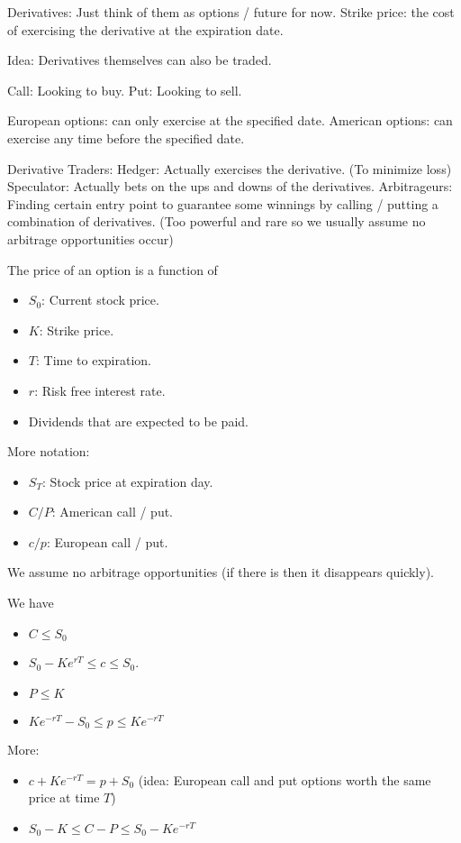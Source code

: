 \documentclass[a4paper]{article}
\begin{document}
Derivatives: Just think of them as options / future for now. 
Strike price: the cost of exercising the derivative at the expiration date. 

Idea: Derivatives themselves can also be traded. 

Call: Looking to buy. 
Put: Looking to sell. 

European options: can only exercise at the specified date. 
American options: can exercise any time before the specified date. 

Derivative Traders: 
Hedger: Actually exercises the derivative. (To minimize loss)
Speculator: Actually bets on the ups and downs of the derivatives. 
Arbitrageurs: Finding certain entry point to guarantee some winnings by calling / putting a combination of derivatives. (Too powerful and rare so we usually assume no arbitrage opportunities occur)

The price of an option is a function of 
\begin{itemize}
\item $S_0$: Current stock price. 
\item $K$: Strike price. 
\item $T$: Time to expiration. 
\item $r$: Risk free interest rate. 
\item Dividends that are expected to be paid. 
\end{itemize}
More notation: 
\begin{itemize}
\item $S_T$: Stock price at expiration day. 
\item $C/P$: American call / put. 
\item $c/p$: European call / put. 
\end{itemize}

We assume no arbitrage opportunities (if there is then it disappears quickly). 

We have 
\begin{itemize}
\item $C\leq S_0$
\item $S_0-Ke^{rT}\leq c\leq S_0$. 
\item $P\leq K$
\item $Ke^{-rT}-S_0\leq p\leq Ke^{-rT}$
\end{itemize}

More:
\begin{itemize}
\item $c+Ke^{-rT}=p+S_0$ (idea: European call and put options worth the same price at time $T$)
\item $S_0-K\leq C-P\leq S_0-Ke^{-rT}$
\end{itemize}
\end{document}

